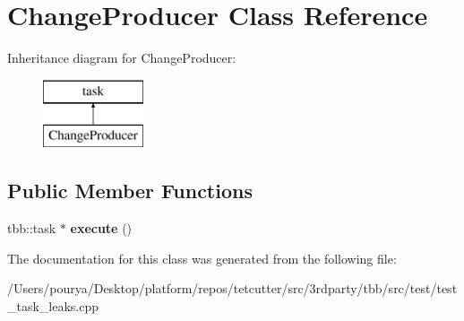 \hypertarget{classChangeProducer}{}\section{Change\+Producer Class Reference}
\label{classChangeProducer}
Inheritance diagram for Change\+Producer\+:\begin{figure}[H]
\begin{center}
\leavevmode
\includegraphics[height=2.000000cm]{classChangeProducer}
\end{center}
\end{figure}
\subsection*{Public Member Functions}
\begin{DoxyCompactItemize}
\item 
\hypertarget{classChangeProducer_a84f4c3bccd3955b67163331d338ee548}{}tbb\+::task $\ast$ {\bfseries execute} ()\label{classChangeProducer_a84f4c3bccd3955b67163331d338ee548}

\end{DoxyCompactItemize}


The documentation for this class was generated from the following file\+:\begin{DoxyCompactItemize}
\item 
/\+Users/pourya/\+Desktop/platform/repos/tetcutter/src/3rdparty/tbb/src/test/test\+\_\+task\+\_\+leaks.\+cpp\end{DoxyCompactItemize}
